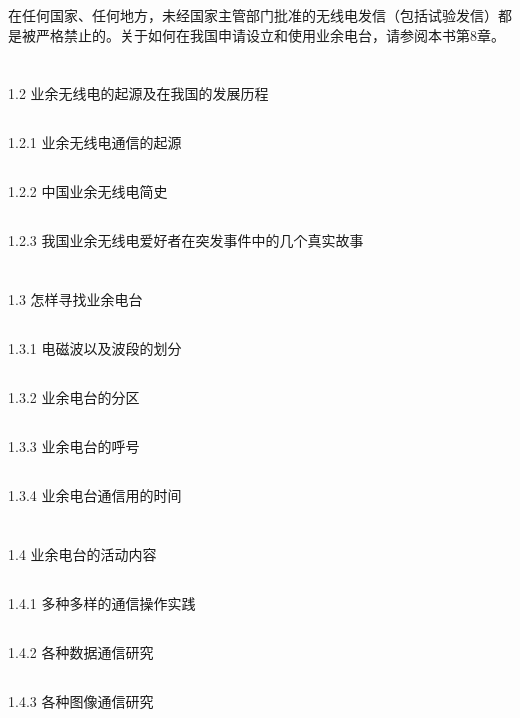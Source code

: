 \documentclass[12pt,UTF8]{ctexbook}
\begin{document}
在任何国家、任何地方，未经国家主管部门批准的无线电发信（包括试验发信）都是被严格禁止的。关于如何在我国申请设立和使用业余电台，请参阅本书第8章。

\section{}1.2 业余无线电的起源及在我国的发展历程
\subsection{}1.2.1 业余无线电通信的起源
\subsection{}1.2.2 中国业余无线电简史
\subsection{}1.2.3 我国业余无线电爱好者在突发事件中的几个真实故事
\section{}1.3 怎样寻找业余电台
\subsection{}1.3.1 电磁波以及波段的划分
\subsection{}1.3.2 业余电台的分区
\subsection{}1.3.3 业余电台的呼号
\subsection{}1.3.4 业余电台通信用的时间
\section{}1.4 业余电台的活动内容
\subsection{}1.4.1 多种多样的通信操作实践
\subsection{}1.4.2 各种数据通信研究
\subsection{}1.4.3 各种图像通信研究
\end{document}

